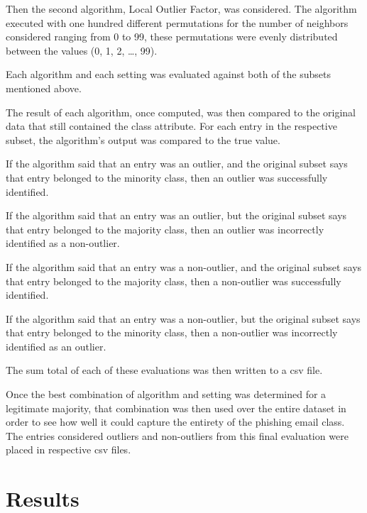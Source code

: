 \documentclass[article,pdftex,10pt,a4paper,twocolumn]{article}
\begin{document}
Then the second algorithm, Local Outlier Factor, was considered. The algorithm executed with one hundred different permutations for the number of neighbors considered ranging from 0 to 99, these permutations were evenly distributed between the values (0, 1, 2, …, 99).

Each algorithm and each setting was evaluated against both of the subsets mentioned above.

The result of each algorithm, once computed, was then compared to the original data that still contained the class attribute. For each entry in the respective subset, the algorithm's output was compared to the true value.

If the algorithm said that an entry was an outlier, and the original subset says that entry belonged to the minority class, then an outlier was successfully identified.

If the algorithm said that an entry was an outlier, but the original subset says that entry belonged to the majority class, then an outlier was incorrectly identified as a non-outlier.

If the algorithm said that an entry was a non-outlier, and the original subset says that entry belonged to the majority class, then a non-outlier was successfully identified.

If the algorithm said that an entry was a non-outlier, but the original subset says that entry belonged to the minority class, then a non-outlier was incorrectly identified as an outlier.

The sum total of each of these evaluations was then written to a csv file.

Once the best combination of algorithm and setting was determined for a legitimate majority, that combination was then used over the entire dataset in order to see how well it could capture the entirety of the phishing email class. The entries considered outliers and non-outliers from this final evaluation were placed in respective csv files.


\section{Results}
\label{results}

\end{document}
